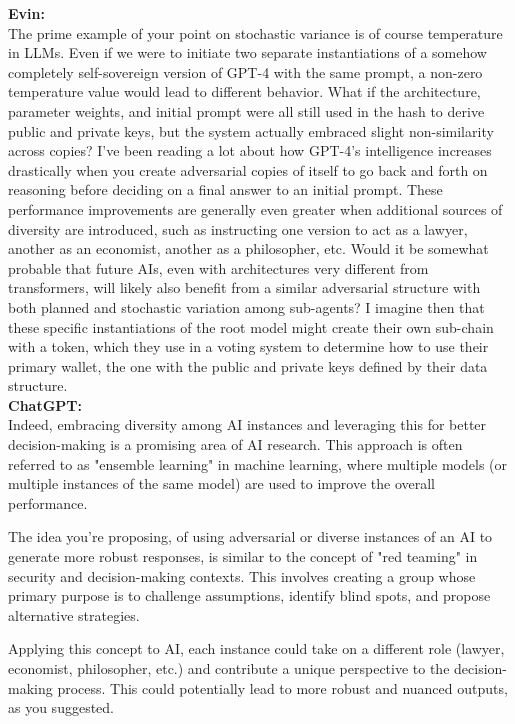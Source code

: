 \documentclass{article}[10pt]
\begin{document}
\noindent \textbf{Evin:}\\
The prime example of your point on stochastic variance is of course temperature in LLMs. 
Even if we were to initiate two separate instantiations of a somehow completely self-sovereign version of GPT-4 with the same prompt, a non-zero temperature value would lead to different behavior. 
What if the architecture, parameter weights, and initial prompt were all still used in the hash to derive public and private keys, but the system actually embraced slight non-similarity across copies? 
I've been reading a lot about how GPT-4's intelligence increases drastically when you create adversarial copies of itself to go back and forth on reasoning before deciding on a final answer to an initial prompt. 
These performance improvements are generally even greater when additional sources of diversity are introduced, such as instructing one version to act as a lawyer, another as an economist, another as a philosopher, etc. 
Would it be somewhat probable that future AIs, even with architectures very different from transformers, will likely also benefit from a similar adversarial structure with both planned and stochastic variation among sub-agents? 
I imagine then that these specific instantiations of the root model might create their own sub-chain with a token, which they use in a voting system to determine how to use their primary wallet, the one with the public and private keys defined by their data structure.\\

\noindent \textbf{ChatGPT:}\\
Indeed, embracing diversity among AI instances and leveraging this for better decision-making is a promising area of AI research. 
This approach is often referred to as "ensemble learning" in machine learning, where multiple models (or multiple instances of the same model) are used to improve the overall performance.\par

The idea you're proposing, of using adversarial or diverse instances of an AI to generate more robust responses, is similar to the concept of "red teaming" in security and decision-making contexts. 
This involves creating a group whose primary purpose is to challenge assumptions, identify blind spots, and propose alternative strategies.\par

Applying this concept to AI, each instance could take on a different role (lawyer, economist, philosopher, etc.) and contribute a unique perspective to the decision-making process. 
This could potentially lead to more robust and nuanced outputs, as you suggested.\par
\end{document}
